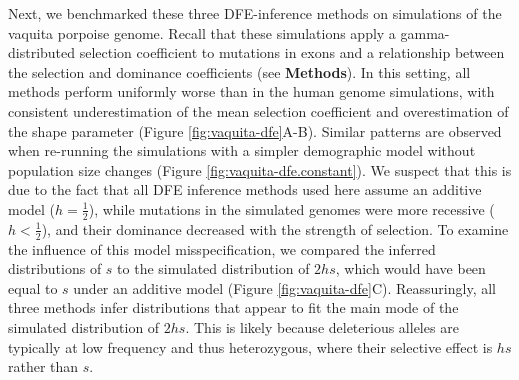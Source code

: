 \documentclass[hidelinks]{article}
\begin{document}
    Next, we benchmarked these three DFE-inference methods on simulations of the vaquita porpoise genome.
    Recall that these simulations apply a gamma-distributed selection coefficient to mutations in exons
    and a relationship between the selection and dominance coefficients (see \textbf{Methods}).
    In this setting, all methods perform uniformly worse than in the human genome simulations,
    with consistent underestimation of the mean selection coefficient    
    and overestimation of the shape parameter (Figure \ref{fig:vaquita-dfe}A-B). 
    Similar patterns are observed when re-running the simulations with a simpler demographic model
    without population size changes (Figure \ref{fig:vaquita-dfe.constant}).
    We suspect that this is due to the fact that all DFE inference methods used here assume an additive model ($h = \frac{1}{2}$),
    while mutations in the simulated genomes were more recessive ($h < \frac{1}{2}$), and their dominance decreased with the strength of selection. 
    To examine the influence of this model misspecification, we compared the inferred distributions of $s$ to the 
    simulated distribution of $2hs$, which would have been equal to $s$ under an additive model (Figure \ref{fig:vaquita-dfe}C).
    Reassuringly, all three methods infer distributions that appear to fit the main mode of the simulated distribution of $2hs$.
    This is likely because deleterious alleles are typically at low frequency and thus heterozygous, 
    where their selective effect is $h s$ rather than $s$.
\end{document}
